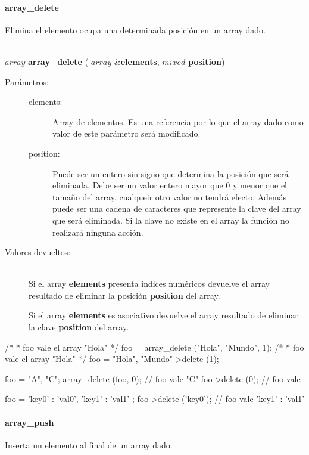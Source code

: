 \paragraph{array\_delete}
Elimina el elemento ocupa una determinada posición en un array dado.

\begin{framed}
\hfill \\ $array$ \textbf{array\_delete} ( $array$ \&\textbf{elements}, $mixed$ \textbf{position})  
\begin{description}
\item [Parámetros:] \hfill 
   \begin{description}
   \item[elements:] Array de elementos. Es una referencia por lo que el array dado como valor de este parámetro será modificado. 
   \item[position:] Puede ser un entero sin signo que determina la posición que será eliminada. Debe ser un valor entero mayor que $0$ y
   menor que el tamaño del array, cualqueir otro valor no tendrá efecto. Además puede ser una cadena de caracteres que 
   represente la clave del array que será eliminada. Si la clave no existe en el array la función no realizará ninguna acción.
   \end{description}
\item[Valores devueltos:] \hfill \\
   Si el array \textbf{elements} presenta índices numéricos devuelve el array resultado de eliminar la posición \textbf{position} del array. 
   
   Si el array \textbf{elements} es asociativo devuelve el array resultado de eliminar la clave \textbf{position} del array. 
\end{description}
\end{framed}
     
\begin{myverbatim}   
   /*
    * foo vale el array { "Hola" }
    */
   foo = array_delete ({"Hola", "Mundo"}, 1); 
   /*
    * foo vale el array { "Hola" }
    */
   foo = {"Hola", "Mundo"}->delete (1);
   
   foo = {"A", "C"};
   array_delete (foo, 0); // foo vale {"C"}
   foo->delete (0); // foo vale {}
   
   foo = { 'key0' : 'val0', 'key1' : 'val1' };
   foo->delete ('key0'); // foo vale { 'key1' : 'val1' }
\end{myverbatim}

\paragraph{array\_push}
Inserta un elemento al final de un array dado.

